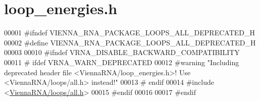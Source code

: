 \hypertarget{loop__energies_8h_source}{}\section{loop\+\_\+energies.\+h}
\label{loop__energies_8h_source}

\begin{DoxyCode}
00001 \textcolor{preprocessor}{#ifndef VIENNA\_RNA\_PACKAGE\_LOOPS\_ALL\_DEPRECATED\_H}
00002 \textcolor{preprocessor}{#define VIENNA\_RNA\_PACKAGE\_LOOPS\_ALL\_DEPRECATED\_H}
00003 
00010 \textcolor{preprocessor}{#ifndef VRNA\_DISABLE\_BACKWARD\_COMPATIBILITY}
00011 \textcolor{preprocessor}{# ifdef VRNA\_WARN\_DEPRECATED}
00012 \textcolor{preprocessor}{#warning "Including deprecated header file <ViennaRNA/loop\_energies.h>! Use <ViennaRNA/loops/all.h>
       instead!"}
00013 \textcolor{preprocessor}{# endif}
00014 \textcolor{preprocessor}{#include <\hyperlink{all_8h}{ViennaRNA/loops/all.h}>}
00015 \textcolor{preprocessor}{#endif}
00016 
00017 \textcolor{preprocessor}{#endif}
\end{DoxyCode}
